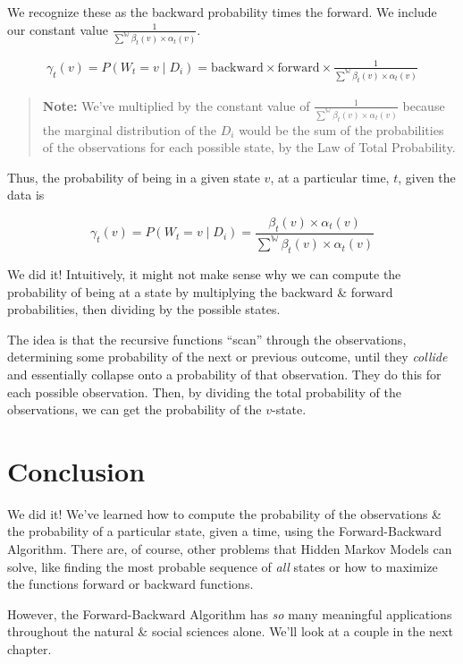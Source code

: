 \documentclass[
]{book}
\begin{document}
We recognize these as the backward probability times the forward. We include our constant value \(\frac{1}{ \sum^\mathbb{W}\beta_t(v) \times \alpha_t(v)}\).

\begin{align*}
\gamma_t(v) =  P(W_t = v \mid D_i) = \text{backward} \times \text{forward} \times \frac{1}{ \sum^\mathbb{W} \beta_t(v) \times \alpha_t(v)}
\end{align*}

\begin{quote}
\textbf{Note:} We've multiplied by the constant value of \(\frac{1}{ \sum^\mathbb{W}\beta_t(v) \times \alpha_t(v)}\) because the marginal distribution of the \(D_i\) would be the sum of the probabilities of the observations for each possible state, by the Law of Total Probability.
\end{quote}

Thus, the probability of being in a given state \(v\), at a particular time, \(t\), given the data is

\[\gamma_t(v) =  P(W_t = v \mid D_i) = \frac{\beta_t(v) \times \alpha_t(v)}{\sum^\mathbb{W} \beta_t(v) \times \alpha_t(v)}\]

We did it! Intuitively, it might not make sense why we can compute the probability of being at a state by multiplying the backward \& forward probabilities, then dividing by the possible states.

The idea is that the recursive functions ``scan'' through the observations, determining some probability of the next or previous outcome, until they \emph{collide} and essentially collapse onto a probability of that observation. They do this for each possible observation. Then, by dividing the total probability of the observations, we can get the probability of the \(v\)-state.

\hypertarget{conclusion-1}{%
\section{Conclusion}\label{conclusion-1}}

We did it! We've learned how to compute the probability of the observations \& the probability of a particular state, given a time, using the Forward-Backward Algorithm. There are, of course, other problems that Hidden Markov Models can solve, like finding the most probable sequence of \emph{all} states or how to maximize the functions forward or backward functions.

However, the Forward-Backward Algorithm has \emph{so} many meaningful applications throughout the natural \& social sciences alone. We'll look at a couple in the next chapter.
\end{document}
